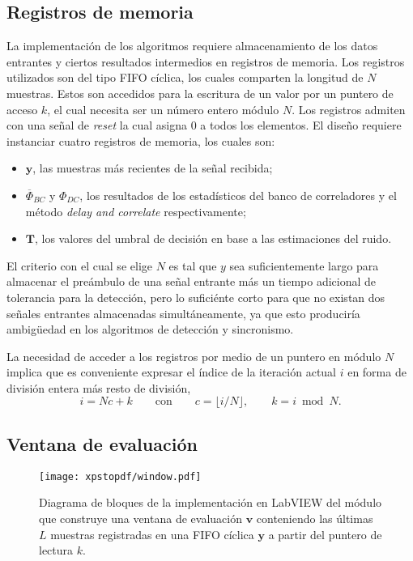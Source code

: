 \subsection{Registros de memoria}

La implementación de los algoritmos requiere almacenamiento de los datos entrantes y ciertos resultados intermedios en registros de memoria. Los registros utilizados son del tipo FIFO cíclica, los cuales comparten la longitud de $N$ muestras. Estos son accedidos para la escritura de un valor por un puntero de acceso $k$, el cual necesita ser un número entero módulo $N$. Los registros admiten con una señal de \textit{reset} la cual asigna 0 a todos los elementos. El diseño requiere instanciar cuatro registros de memoria, los cuales son:
\begin{itemize}
    \item $\mathbf{y}$, las muestras más recientes de la señal recibida;
    \item $\overline{\Phi}_{BC}$ y $\Phi_{DC}$, los resultados de los estadísticos del banco de correladores y el método \textit{delay and correlate} respectivamente;
    \item $\mathbf{T}$, los valores del umbral de decisión en base a las estimaciones del ruido.
\end{itemize}

El criterio con el cual se elige $N$ es tal que $\textit{y}$ sea suficientemente largo para almacenar el preámbulo de una señal entrante más un tiempo adicional de tolerancia para la detección, pero lo suficiénte corto para que no existan dos señales entrantes almacenadas simultáneamente, ya que esto produciría ambigüedad en los algoritmos de detección y sincronismo.

La necesidad de acceder a los registros por medio de un puntero en módulo $N$ implica que es conveniente expresar el índice de la iteración actual $i$ en forma de división entera más resto de división,
\begin{equation}
    i = Nc+k \qquad \text{con} \qquad c = \lfloor i/N \rfloor, \qquad k = i \bmod N.
\end{equation}

\subsection{Ventana de evaluación}

\begin{figure}[t]
    \centering{}\texttt{[image: xpstopdf/window.pdf]}
    \caption{Diagrama de bloques de la implementación en LabVIEW del módulo que construye una ventana de evaluación $\mathbf{v}$ conteniendo las últimas $L$ muestras registradas en una FIFO cíclica $\mathbf{y}$ a partir del puntero de lectura $k$.\label{fig:window-select-lv}}  
\end{figure}


